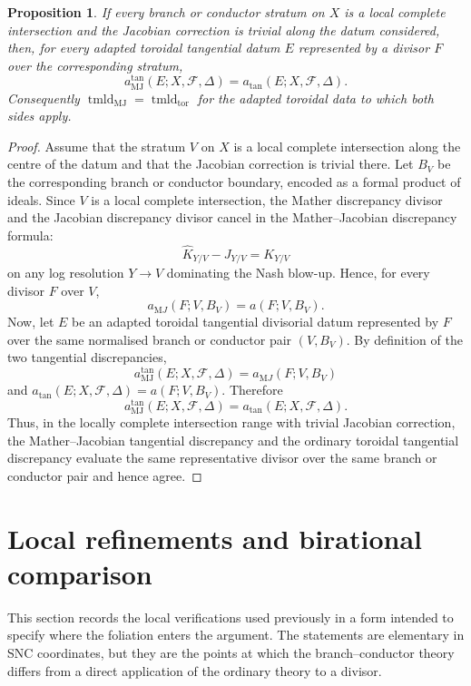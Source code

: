 \documentclass[11pt]{amsart}
\numberwithin{equation}{section}
\theoremstyle{plain}
\newtheorem{Proposition}[Theorem]{Proposition}
\theoremstyle{definition}
\newcommand{\tmldtor}{\operatorname{tmld}_{\mathrm{tor}}}
\newcommand{\MJ}{\mathrm{MJ}}
\newcommand{\cF}{\mathcal F}
\begin{document}
\begin{Proposition}
If every branch or conductor stratum on $X$ is a local complete intersection and the Jacobian correction is trivial along the datum considered, then, for every adapted toroidal tangential datum $E$ represented by a divisor $F$ over the corresponding stratum,
\[
a^{\tan}_{\MJ}(E;X,\cF,\Delta)=a_{\tan}(E;X,\cF,\Delta).
\]
Consequently $\operatorname{tmld}_{\MJ}=\tmldtor$ for the adapted toroidal data to which both sides apply.
\end{Proposition}

\begin{proof}
Assume that the stratum $V$ on $X$ is a local complete intersection along the centre of the datum and that the Jacobian correction is trivial there. Let \(B_V\) be the corresponding branch or conductor boundary, encoded as a formal product of ideals. Since \(V\) is a local complete intersection, the Mather discrepancy divisor and the Jacobian discrepancy divisor cancel in the Mather--Jacobian discrepancy formula:
\[
\widehat K_{Y/V}-J_{Y/V}=K_{Y/V}
\]
on any log resolution \(Y\to V\) dominating the Nash blow-up. Hence, for every divisor \(F\) over \(V\),
\[
a_{\mathrm MJ}(F;V,B_V)=a(F;V,B_V).
\]
Now, let \(E\) be an adapted toroidal tangential divisorial datum represented by \(F\) over the same normalised branch or conductor pair \((V,B_V)\). By definition of the two tangential discrepancies,
\[
a^{\tan}_{\MJ}(E;X,\cF,\Delta)
=
a_{\mathrm MJ}(F;V,B_V)
\]
and
$
a_{\tan}(E;X,\cF,\Delta)
=
a(F;V,B_V).
$
Therefore
\[
a^{\tan}_{\MJ}(E;X,\cF,\Delta)
=
a_{\tan}(E;X,\cF,\Delta).
\]
Thus, in the locally complete intersection range with trivial Jacobian correction, the Mather--Jacobian tangential discrepancy and the ordinary toroidal tangential discrepancy evaluate the same representative divisor over the same branch or conductor pair and hence agree.
\end{proof}

\section{Local refinements and birational comparison}
\label{sec:expanded-verification}

This section records the local verifications used previously in a form intended to specify where the foliation enters the argument.  The statements are elementary in SNC coordinates, but they are the points at which the branch--conductor theory differs from a direct application of the ordinary theory to a divisor.
\end{document}
